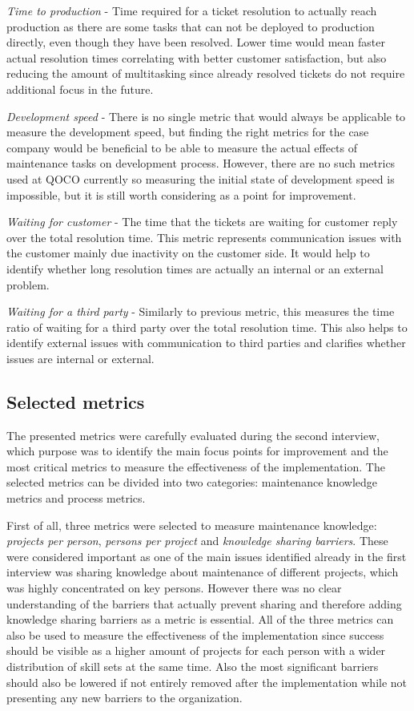 \emph{Time to production} - Time required for a ticket resolution to actually reach production as there are some tasks that can not be deployed to production directly, even though they have
been resolved. Lower time would mean faster actual resolution times correlating with better customer satisfaction, but also reducing the amount of multitasking since already resolved tickets
do not require additional focus in the future.

\emph{Development speed} - There is no single metric that would always be applicable to measure the development speed, but finding the right metrics
for the case company would be beneficial to be able to measure the actual effects of maintenance tasks on development process. However, there are no such metrics used at QOCO currently so measuring the initial state
of development speed is impossible, but it is still worth considering as a point for improvement.

\emph{Waiting for customer} - The time that the tickets are waiting for customer reply over the total resolution time. This metric represents communication issues with the customer
mainly due inactivity on the customer side. It would help to identify whether long resolution times are actually an internal or an external problem.

\emph{Waiting for a third party} - Similarly to previous metric, this measures the time ratio of waiting for a third party over the total resolution time. This also helps to identify external
issues with communication to third parties and clarifies whether issues are internal or external.

\subsection*{Selected metrics}

The presented metrics were carefully evaluated during the second interview, which purpose was to identify the main focus points for improvement and the most critical metrics to measure the
effectiveness of the implementation. The selected metrics can be divided into two categories: maintenance knowledge metrics and process metrics.

First of all, three metrics were selected to measure maintenance knowledge: \emph{projects per person}, \emph{persons per project} and \emph{knowledge sharing barriers}.
These were considered important as one
of the main issues identified already in the first interview was sharing knowledge about maintenance of different projects, which was highly concentrated on key persons. However there was no
clear understanding of the barriers that actually prevent sharing and therefore adding knowledge sharing barriers as a metric is essential. All of the three metrics can also be used to
measure the effectiveness of the implementation since success should be visible as a higher amount of projects for each person with a wider distribution of skill sets at the same time. Also the most
significant barriers should also be lowered if not entirely removed after the implementation while not presenting any new barriers to the organization.

